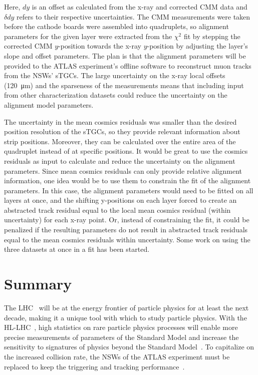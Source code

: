 Here, $dy$ is an offset as calculated from the x-ray and corrected CMM data and $\delta dy$ refers to their respective uncertainties. The CMM measurements were taken before the cathode boards were assembled into quadruplets, so alignment parameters for the given layer were extracted from the $\chi^2$ fit by stepping the corrected CMM $y$-position towards the x-ray $y$-position by adjusting the layer's slope and offset parameters. The plan is that the alignment parameters will be provided to the ATLAS experiment's offline software to reconstruct muon tracks from the NSWs' sTGCs. The large uncertainty on the x-ray local offsets (\SI{120}{\micro\meter}) and the sparseness of the measurements means that including input from other characterization datasets could reduce the uncertainty on the alignment model parameters. 

The uncertainty in the mean cosmics residuals was smaller than the desired position resolution of the sTGCs, so they provide relevant information about strip positions. Moreover, they can be calculated over the entire area of the quadruplet instead of at specific positions. It would be great to use the cosmics residuals as input to calculate and reduce the uncertainty on the alignment parameters. Since mean cosmics residuals can only provide relative alignment information, one idea would be to use them to constrain the fit of the alignment parameters. In this case, the alignment parameters would need to be fitted on all layers at once, and the shifting y-positions on each layer forced to create an abstracted track residual equal to the local mean cosmics residual (within uncertainty) for each x-ray point. Or, instead of constraining the fit, it could be penalized if the resulting parameters do not result in abstracted track residuals equal to the mean cosmics residuals within uncertainty. Some work on using the three datasets at once in a fit has been started.

\section{Summary}
\label{sec:summary}

The LHC~\cite{evans_lhc_2008} will be at the energy frontier of particle physics for at least the next decade, making it a unique tool with which to study particle physics. With the HL-LHC~\cite{hl_lhc_tdr}, high statistics on rare particle physics processes will enable more precise measurements of parameters of the Standard Model and increase the sensitivity to signatures of physics beyond the Standard Model~\cite{dainese_physics_2018}. To capitalize on the increased collision rate, the NSWs of the ATLAS experiment must be replaced to keep the triggering and tracking performance~\cite{nsw_tdr}. 

